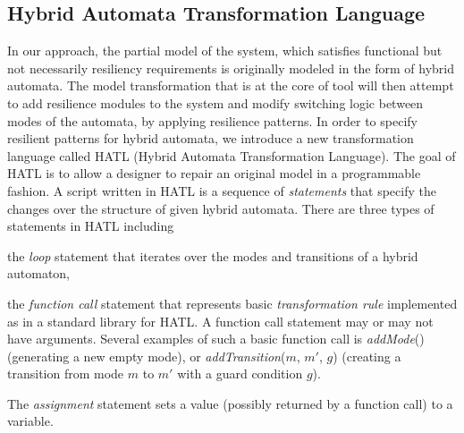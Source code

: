 \subsection{Hybrid Automata Transformation Language}
In our approach, the partial model of the system, which satisfies functional but not necessarily resiliency requirements is originally modeled in the form of hybrid automata. The model transformation that is at the core of \toolreaffirm tool will then attempt to add resilience modules to the system and modify switching logic between modes of the automata, by applying resilience patterns. 
%
%
%
In order to specify resilient patterns for hybrid automata, we introduce a new transformation language called HATL (Hybrid Automata Transformation Language). The goal of HATL is to allow a designer to repair an original model in a programmable fashion. A script written in HATL is a sequence of \emph{statements} that specify the changes over the structure of given hybrid automata. There are three types of statements in HATL including
\begin{inparaenum}[(a)]
\item the \emph{loop} statement that iterates over the modes and transitions of a hybrid automaton,
\item the \emph{function call} statement that represents basic \emph{transformation rule} implemented as in a standard library for HATL. A function call statement may or may not have arguments. Several examples of such a basic function call is \emph{addMode}() (\ie generating a new empty mode), or \emph{addTransition}($m$, $m'$, $g$) (\ie creating a transition from mode $m$ to $m'$ with a guard condition $g$).
\item The \emph{assignment} statement sets a value (possibly returned by a function call) to a variable.
\end{inparaenum}
%

